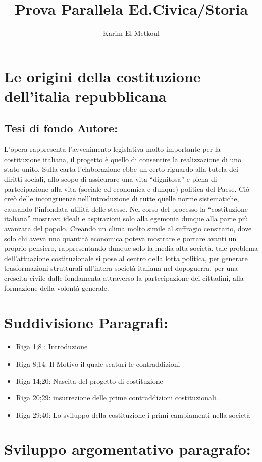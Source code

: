 \documentclass{article}
\title{Prova Parallela Ed.Civica/Storia}
\author{Karim El-Metkoul}
\begin{document}
\maketitle
\section{Le origini della costituzione dell'italia repubblicana}
\subsection{Tesi di fondo Autore:}
L’opera rappresenta l'avvenimento legislativa molto importante per 
la costituzione italiana, il progetto è quello di consentire la realizzazione di uno stato unito.
Sulla carta l’elaborazione ebbe un certo riguardo alla tutela dei diritti sociali, allo scopo di assicurare una vita “dignitosa” e piena di partecipazione alla vita (sociale ed economica e dunque) politica del Paese.
Ciò creò delle incongruenze nell'introduzione di tutte quelle norme sistematiche, causando l'infondata utilità delle stesse.
 Nel corso del processo la “costituzione-italiana” mostrava ideali e aspirazioni solo alla egemonia dunque alla parte più avanzata del popolo.
Creando un clima molto simile al suffragio censitario, dove solo chi aveva una quantità economica poteva mostrare e portare avanti un proprio pensiero, rappresentando dunque solo la media-alta società.
tale problema dell’attuazione costituzionale si pose al centro della lotta politica, per generare trasformazioni strutturali all’intera società italiana nel dopoguerra, per una crescita civile dalle fondamenta attraverso la partecipazione dei cittadini, alla formazione della volontà generale.
\section{Suddivisione Paragrafi:}
\begin{itemize}
    \item Riga 1;8 : Introduzione
    \item Riga 8;14: Il Motivo il quale scaturì le contraddizioni
    \item Riga 14;20: Nascita del progetto di costituzione
    \item Riga 20;29:  insurrezione delle prime contraddizioni costituzionali.
    \item Riga 29;40: Lo sviluppo della costituzione i primi cambiamenti nella società
\end{itemize}
\section{Sviluppo argomentativo paragrafo:}
\end{document}
